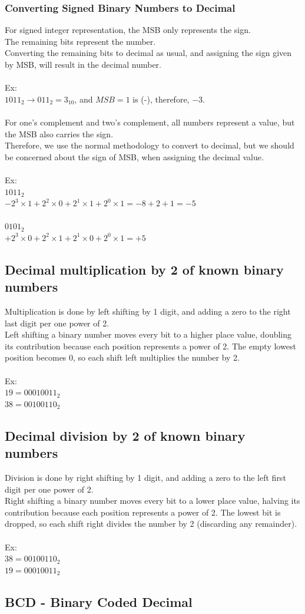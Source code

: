 \documentclass{article}
\begin{document}
\subsubsection*{Converting Signed Binary Numbers to Decimal}
For signed integer representation, the MSB only represents the sign. \\The remaining bits represent the number.\\
Converting the remaining bits to decimal as usual, and assigning the sign given by MSB, will result in the decimal number.\\
\\
Ex:\\
$1011_2 \rightarrow 011_2 = 3_{10}$, and $MSB = 1$ is (-), therefore, $-3$.\\ 
\\
For one's complement and two's complement, all numbers represent a value, but the MSB also carries the sign.\\
Therefore, we use the normal methodology to convert to decimal, but we should be concerned about the sign of MSB,  when assigning the decimal value.\\
\\
Ex:\\
$1011_2$\\
$-2^3 \times 1 + 2^2 \times 0 + 2^1 \times 1 + 2^0 \times 1 = -8 + 2 + 1 = -5$\\
\\
$0101_2$\\
$+2^3 \times 0 + 2^2 \times 1 + 2^1 \times 0 + 2^0 \times 1 = +5$
\newpage
\subsection*{Decimal multiplication by 2 of known binary numbers}
Multiplication is done by left shifting by 1 digit, and adding a zero to the right last digit per one power of 2.\\
Left shifting a binary number moves every bit to a higher place value, doubling its contribution because each position represents a power of 2. The empty lowest position becomes 0, so each shift left multiplies the number by 2.\\
\\
Ex:\\
$19=00010011_2$\\
$38=00100110_2$
\subsection*{Decimal division by 2 of known binary numbers}
Division is done by right shifting by 1 digit, and adding a zero to the left first digit per one power of 2.\\
Right shifting a binary number moves every bit to a lower place value, halving its contribution because each position represents a power of 2. The lowest bit is dropped, so each shift right divides the number by 2 (discarding any remainder).\\
\\
Ex:\\
$38=00100110_2$\\
$19=00010011_2$
\subsection*{BCD - Binary Coded Decimal}
\end{document}
